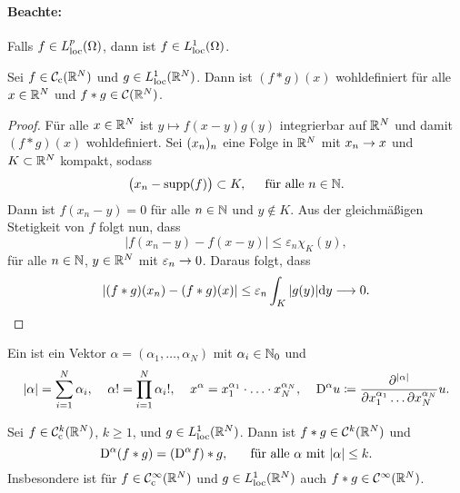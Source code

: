 \paragraph{Beachte:} Falls \(f\in L_{\mathrm{loc}}^p(\Omega)\), dann ist \(f\in L_{\mathrm{loc}}^1(\Omega)\).
\begin{satz}
	Sei \(f\in\mathcal{C}_{\mathrm{c}}(\mathbb{R}^N)\) und \(g\in L_{\mathrm{loc}}^1(\mathbb{R}^N)\). Dann ist \((f\ast g)(x)\) wohldefiniert für alle \(x\in\mathbb{R}^N\) und \(f\ast g\in\mathcal{C}(\mathbb{R}^N)\).
\end{satz}
\begin{proof}
	Für alle \(x\in\mathbb{R}^N\) ist \(y\mapsto f(x-y)g(y)\) integrierbar auf \(\mathbb{R}^N\) und damit \((f\ast g)(x)\) wohldefiniert. Sei \((x_n)_n\) eine Folge in \(\mathbb{R}^N\) mit \(x_n\rightarrow x\) und \(K\subset\mathbb{R}^N\) kompakt, sodass
	\begin{equation*}
		\big(x_n-\operatorname{supp}(f)\big)\subset K,\;\;\;\;\text{ für alle }n\in\mathbb{N}.
	\end{equation*}
	Dann ist \(f(x_n-y)=0\) für alle \(n\in\mathbb{N}\) und \(y\notin K\). Aus der gleichmäßigen Stetigkeit von \(f\) folgt nun, dass
	\begin{equation*}
		|f(x_n-y)-f(x-y)|\leq\varepsilon_n\chi_K(y),
	\end{equation*}
	für alle \(n\in\mathbb{N}\), \(y\in\mathbb{R}^N\) mit \(\varepsilon_n\rightarrow0\). Daraus folgt, dass
	\begin{equation*}
		|(f\ast g)(x_n)-(f\ast g)(x)|\leq\varepsilon_n\int_K|g(y)|\mathrm{d}y\longrightarrow0.
	\end{equation*}
\end{proof}
\begin{definition}[Multiindex]
	Ein  ist ein Vektor \(\alpha=(\alpha_1,\ldots,\alpha_N)\) mit \(\alpha_i\in\mathbb{N}_0\) und
	\begin{equation*}
		|\alpha|=\sum_{i=1}^N\alpha_i,\;\;\;\;
		\alpha!=\prod_{i=1}^{N}\alpha_i!,\;\;\;\;
		x^\alpha=x_1^{\alpha_1}\cdot\ldots\cdot x_N^{\alpha_N},\;\;\;\;
		\mathrm{D}^\alpha u\coloneqq\frac{\partial^{|\alpha|}}{\partial x_1^{\alpha_1}\ldots\partial x_N^{\alpha_N}}u.
	\end{equation*}
\end{definition}
\begin{satz}
	Sei \(f\in\mathcal{C}_{\mathrm{c}}^k(\mathbb{R}^N)\), \(k\geq1\), und \(g\in L_{\mathrm{loc}}^1(\mathbb{R}^N)\). Dann ist \(f\ast g\in\mathcal{C}^k(\mathbb{R}^N)\) und
	\begin{equation*}
		\mathrm{D}^\alpha(f\ast g)=(\mathrm{D}^\alpha f)\ast g,\;\;\;\;\;\text{ für alle }\alpha\text{ mit }|\alpha|\leq k.
	\end{equation*}
	Insbesondere ist für \(f\in\mathcal{C}_{\mathrm{c}}^\infty(\mathbb{R}^N)\) und \(g\in L_{\mathrm{loc}}^1(\mathbb{R}^N)\) auch \(f\ast g\in\mathcal{C}^\infty(\mathbb{R}^N)\).
\end{satz}

